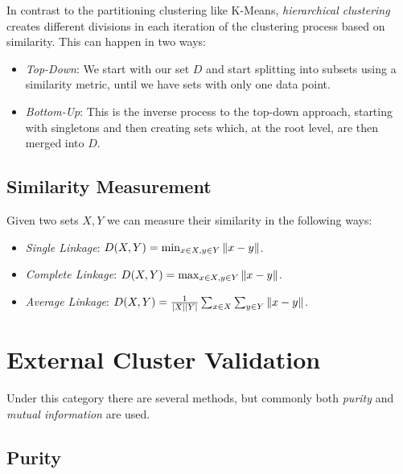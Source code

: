 In contrast to the partitioning clustering like K-Means, \emph{hierarchical clustering} creates different divisions in each iteration
of the clustering process based on similarity. This can happen in two ways:

\begin{itemize}

	\item \emph{Top-Down}: We start with our set \(D\) and start splitting into subsets using a similarity metric, until we have sets with only one data point.

	\item \emph{Bottom-Up}: This is the inverse process to the top-down approach, starting with singletons and then creating sets which, at the root level, are then merged into \(D\).

\end{itemize}

\subsection{Similarity Measurement}

Given two sets \(X, Y\) we can measure their similarity in the following ways:

\begin{itemize}

	\item \emph{Single Linkage}: \(D(X,Y)= \min_{x \in X, y \in Y} \left\| x - y \right\|\).

	\item \emph{Complete Linkage}: \(D(X,Y)= \max_{x \in X, y \in Y} \left\| x - y \right\|\).

	\item \emph{Average Linkage}: \(D(X,Y)= \frac{1}{|X||Y|} \sum_{x \in X}  \sum_{y \in Y} \left\| x - y \right\|\).

\end{itemize}

\section{External Cluster Validation}

Under this category there are several methods, but commonly both \emph{purity} and \emph{mutual information} are used.

\subsection{Purity}

